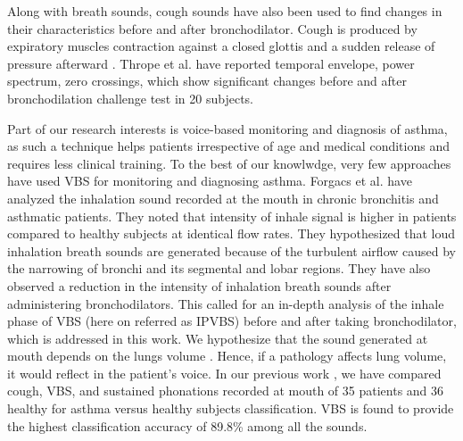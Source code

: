 \documentclass{article}
\begin{document}
Along with breath sounds, cough sounds have also been used to find changes in their characteristics before and after bronchodilator. Cough is produced by expiratory muscles contraction against a closed glottis and a sudden release of pressure afterward \cite{evans1975mechanical}. Thrope et al. \cite{thorpe2001acoustic} have reported temporal envelope, power spectrum, zero crossings, which show significant changes before and after bronchodilation challenge test in 20 subjects.


Part of our research interests is voice-based monitoring and diagnosis of asthma, as such a technique helps patients irrespective of age and medical conditions and requires less clinical training.
To the best of our knowlwdge, very few approaches have used VBS for monitoring and diagnosing asthma. 
Forgacs et al. \cite{forgacs1971breath} have analyzed the inhalation sound recorded at the mouth in chronic bronchitis and asthmatic patients. They noted that intensity of inhale signal is higher in patients compared to healthy subjects at identical flow rates.  They hypothesized that loud inhalation breath sounds are generated because of the turbulent airflow caused by the narrowing of bronchi and its segmental and lobar regions. They have also observed a reduction in the intensity of inhalation breath sounds after administering bronchodilators. This called for an in-depth analysis of the inhale phase of VBS (here on referred as IPVBS) before and after taking bronchodilator, which is addressed in this work. We hypothesize that the sound generated at mouth depends on the lungs volume \cite{iwarsson1998effects}. Hence, if a pathology affects lung volume, it would reflect in the patient's voice. 
In our previous work \cite{yadav2018comparison}, we have compared cough, VBS, and sustained phonations recorded at mouth of 35 patients and 36 healthy for asthma versus healthy subjects classification. VBS is found to provide the highest classification accuracy of 89.8\% among all the sounds.
\end{document}
